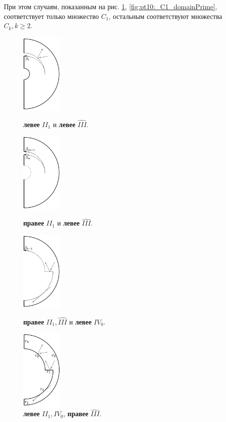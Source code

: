 \begin{statement}
При этом случаям, показанным на рис. \ref{fig:pt10:_C1_domain}, \ref{fig:pt10:_C1_domainPrime}, соответствует только множество $C_1$, остальным соответствуют множества $C_k, k\geq 2$.
\label{stat:domain_shapes}
\begin{figure}[!htb]
\centering
\includegraphics[width=2cm]{images/section3_circular/atoms/branching/terminal_min.pdf}
    \caption{\textbf{левее} $II_1$ и \textbf{левее} $\widehat{III}$.}
    \label{fig:pt10:_terminal_min_domain}
\endminipage\hfill
{}
\centering
\includegraphics[width=2cm]{images/section3_circular/atoms/branching/branching_domain.pdf}
    \caption{\textbf{правее} $II_1$ и \textbf{левее} $\widehat{III}$.}
    \label{fig:pt10:_branching_domain}
\endminipage\hfill
{}
\centering
\includegraphics[width=2cm]{images/section3_circular/atoms/branching/terminal_max.pdf}
    \caption{\textbf{правее} $II_1, \widehat{III}$ и \textbf{левее} $IV_0$.}
    \label{fig:pt10:_terminal_max_domain}
\endminipage\hfill
{}
\centering
\includegraphics[width=2cm]{images/section3_circular/atoms/branching/sect3_C1_domain.pdf}
    \caption{\textbf{левее} $II_1, IV_0$, \textbf{правее} $\widehat{III}$.}
    \label{fig:pt10:_C1_domain}
\endminipage\hfill
\end{figure}


\end{statement}
